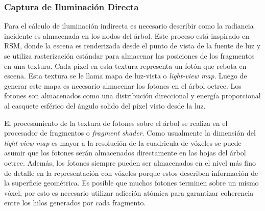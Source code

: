 \subsubsection{Captura de Iluminación Directa}
\label{subsub:voxel_capture}
Para el cálculo de iluminación indirecta es necesario describir como la radiancia incidente es almacenada en los nodos del árbol. Este proceso está inspirado en \ac{RSM}, donde la escena es renderizada desde el punto de vista de la fuente de luz y se utiliza rasterización estándar para almacenar las posiciones de los fragmentos en una textura. Cada píxel en esta textura representa un fotón que rebota en escena. Esta textura se le llama mapa de luz-vista o \emph{light-view map}. Luego de generar este mapa es necesario almacenar los fotones en el árbol octree. Los fotones son almacenados como una distribución direccional y energía proporcional al casquete esférico del ángulo solido del píxel visto desde la luz.

El procesamiento de la textura de fotones sobre el árbol se realiza en el procesador de fragmentos o \emph{fragment shader}. Como usualmente la dimensión del \emph{light-view map} es mayor a la resolución de la cuadricula de vóxeles se puede asumir que los fotones serán almacenados directamente en las hojas del árbol octree. Además, los fotones siempre pueden ser almacenados en el nivel más fino de detalle en la representación con vóxeles porque estos describen información de la superficie geométrica. Es posible que muchos fotones terminen sobre un mismo vóxel, por esto es necesario utilizar adicción atómica para garantizar coherencia entre los hilos generados por cada fragmento.
